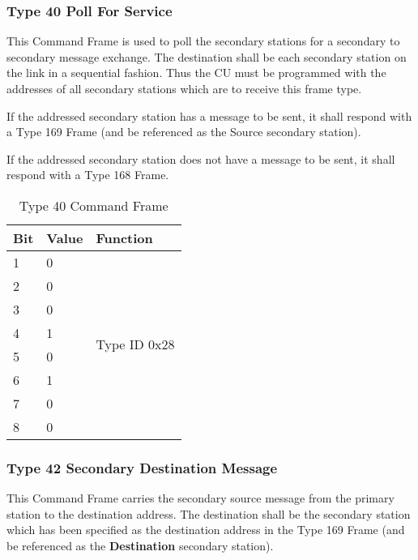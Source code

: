 \documentclass[]{article}
\begin{document}
\subsubsection {Type 40 Poll For Service}
This Command Frame is used to poll the secondary stations for a secondary to secondary message exchange. The destination shall be each secondary station on the link in a sequential fashion. Thus the CU must be programmed with the addresses of all secondary stations which are to receive this frame type. 

If the addressed secondary station has a message to be sent, it shall respond with a Type 169 Frame (and be referenced as the Source secondary station).  

If the addressed secondary station does not have a message to be sent, it shall respond with a Type 168 Frame.

\begin{table}[ht]
	\centering
	\begin{tabular}{lll}
		\hline
		\textbf{Bit} & \textbf{Value} & \textbf{Function}             \\ \hline
		1            & 0              & \multirow{8}{*}{Type ID 0x28} \\
		2            & 0              &                               \\
		3            & 0              &                               \\
		4            & 1              &                               \\
		5            & 0              &                               \\
		6            & 1              &                               \\
		7            & 0              &                               \\
		8            & 0              &                               \\ \hline
	\end{tabular}
	\caption{Type 40 Command Frame}
	\label{tab:type-40-frame}
\end{table}

\clearpage
\subsubsection {Type 42 Secondary Destination Message}
This Command Frame carries the secondary source message from the primary station to the destination address. The destination shall be the secondary station which has been specified as the destination address  in the Type 169 Frame (and be referenced as the \textbf{Destination} secondary station).
\end{document}
